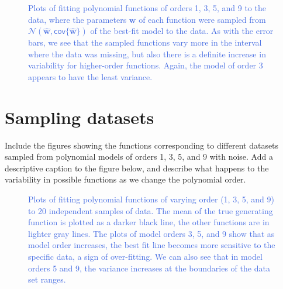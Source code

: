 \documentclass[11pt]{article}
\newcommand{\w}{\mathbf{w}}
\newcommand{\what}{\widehat{\w}}
\begin{document}
\begin{figure}[htbp]
    \centering
    \caption{\textcolor{RoyalBlue}{
        Plots of fitting polynomial functions of orders 1, 3, 5, and 9 to
        the data, where the parameters $\w{}$ of each function were
        sampled from $\mathcal{N}(\what{}, \textsf{cov}\{\what\})$ of the best-fit model to the data. As with
        the error bars, we see that the sampled functions vary more in the
        interval where the data was missing, but also there is a definite
        increase in variability for higher-order functions. Again, the model
        of order 3 appears to have the least variance.
    }}
    \label{fig:sampling_functions}
\end{figure}

\newpage

\section{Sampling datasets}

Include the figures showing the functions corresponding to different datasets
sampled from polynomial models of orders 1, 3, 5, and 9 with noise. 
Add a descriptive caption to the figure below, and describe what happens to
the variability in possible functions as we change the polynomial order.

\begin{figure}[htbp]
    \centering
    \caption{\textcolor{RoyalBlue}{
        Plots of fitting polynomial functions of varying order (1, 3, 5, and 9)
        to 20 independent samples of data. The mean of the true generating
        function is plotted as a darker black line, the other functions are in
        lighter gray lines.
        The plots of model orders 3, 5, and 9 show that as model order
        increases, the best fit line becomes more sensitive to the
        specific data, a sign of over-fitting.
        We can also see that in model orders 5 and 9, the variance increases at
        the boundaries of the data set ranges.
        }}
    \label{fig:sampling_functions}
\end{figure}
\end{document}
